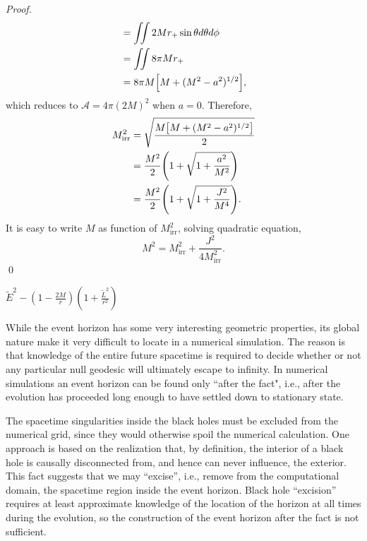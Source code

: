 \begin{proof}
\begin{align}
&= \iint 2Mr_+ \sin\theta d\theta d\phi\\
&= \iint 8\pi M r_+\\
&= 8\pi M \qty[M + (M^2 - a^2)^{1/2}],
\end{align}
which reduces to $\mathcal{A} = 4\pi (2M)^2$ when $a=0$. Therefore,
\begin{align}
M_\mathrm{irr}^2 &= \sqrt{\frac{M\qty[M + (M^2 - a^2)^{1/2}]}{2}}\\
&= \frac{M^2}{2}\qty(1 + \sqrt{1 + \frac{a^2}{M^2}})\\
&= \frac{M^2}{2}\qty(1 + \sqrt{1 + \frac{J^2}{M^4}}).
\end{align}
It is easy to write $M$ as function of $M_\mathrm{irr}^2$, solving quadratic equation,
\begin{equation}
	M^2 = M_\mathrm{irr}^2 + \frac{J^2}{4M_\mathrm{irr}^2}.
\end{equation}
\qed
\end{proof}

$ \tilde{E}^2 - (1 - \frac{2M}{r})( 1 + \frac{\tilde{L}^2}{r^2})$

While the event horizon has some very interesting geometric properties, its global nature make it very difficult to locate in a numerical simulation. The reason is that knowledge of the entire future spacetime is required to decide whether or not any particular null geodesic will ultimately escape to infinity. In numerical simulations an event horizon can be found only ``after the fact", i.e., after the evolution has proceeded long enough to have settled down to stationary state.

The spacetime singularities inside the black holes must be excluded from the numerical grid, since they would otherwise spoil the numerical calculation. One approach is based on the realization that, by definition, the interior of a black hole is causally disconnected from, and hence can never influence, the exterior. This fact suggests that we may ``excise'', i.e., remove from the computational domain, the spacetime region inside the event horizon. Black hole ``excision'' requires at least approximate knowledge of the location of the horizon at all times during the evolution, so the construction of the event horizon after the fact is not sufficient.

